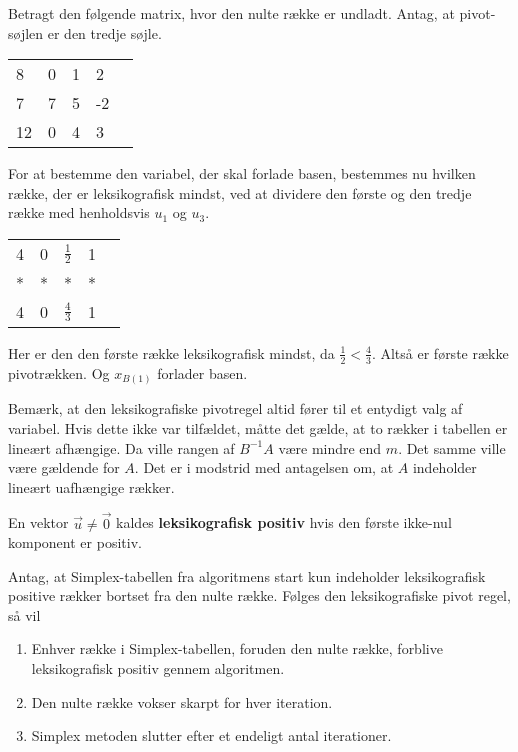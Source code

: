 \begin{eks}
Betragt den følgende matrix, hvor den nulte række er undladt. Antag, at pivot-søjlen er den tredje søjle. 

\begin{center}
\begin{tabular}{|l|llll|}
\hline
8  & 0 & 1 & 2  &  \\
7  & 7 & 5 & -2 &  \\
12 & 0 & 4 & 3  &  \\
\hline
\end{tabular}
\end{center}
For at bestemme den variabel, der skal forlade basen, bestemmes nu hvilken række, der er leksikografisk mindst, ved at dividere den første og den tredje række med henholdsvis $u_1$ og $u_3$.
\begin{center}
\begin{tabular}{|l|llll|}
\hline
4  & 0 & $\frac{1}{2}$ & 1  &  \\
*  & * & * & * &  \\
4 & 0 & $\frac{4}{3}$ & 1  &  \\
\hline
\end{tabular}
\end{center}
Her er den den første række leksikografisk mindst, da $\frac{1}{2}<\frac{4}{3}$.  Altså er første række pivotrækken. Og $x_{B(1)}$ forlader basen. 
\end{eks}

Bemærk, at den leksikografiske pivotregel altid fører til et entydigt valg af variabel. Hvis dette ikke var tilfældet, måtte det gælde, at to rækker i tabellen er lineært afhængige. Da ville rangen af $B^{-1}A$ være mindre end $m$. Det samme ville være gældende for $A$. Det er i modstrid med antagelsen om, at $A$ indeholder lineært uafhængige rækker. 

\begin{defn}
En vektor $\vec{u} \neq \vec{0}$ kaldes \textbf{leksikografisk positiv} hvis den første ikke-nul komponent er positiv.\citep{lexipositiv} 
\end{defn}

 
\begin{stn}
Antag, at Simplex-tabellen fra algoritmens start kun indeholder leksikografisk positive rækker bortset fra den nulte række. Følges den leksikografiske pivot regel, så vil 
\begin{enumerate}[label=(\alph*)]
\item Enhver række i Simplex-tabellen, foruden den nulte række, forblive leksikografisk positiv gennem algoritmen. 
\item Den nulte række vokser skarpt for hver iteration. 
\item Simplex metoden slutter efter et endeligt antal iterationer. 
\end{enumerate}
\label{stn:lexi}
\end{stn}

